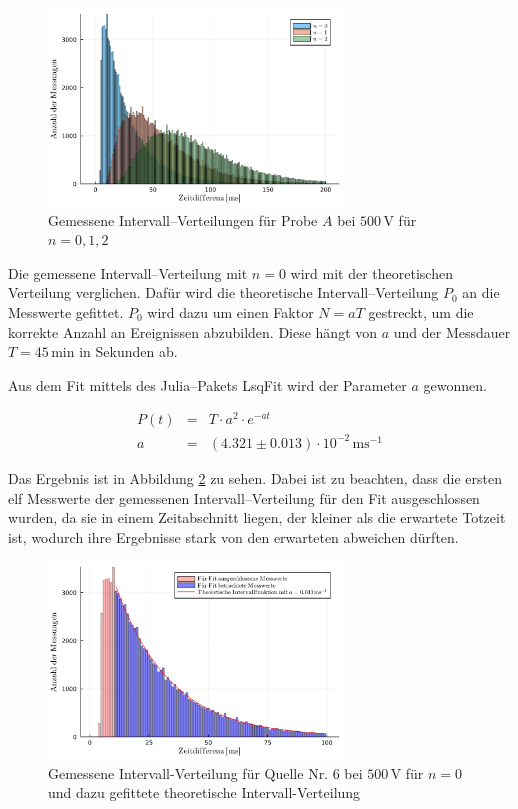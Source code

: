 \documentclass[12pt,a4paper]{scrartcl}
\numberwithin{equation}{section} %
\newcommand{\code}[1]{\textsf{#1}}
\begin{document}
\begin{figure}[h]
	\centering
	\includegraphics[width=0.7\textwidth]{../media/B3.1/interval.pdf}
	\caption{Gemessene Intervall--Verteilungen für Probe $A$ bei $500 \mathrm{\, V}$ für $n = 0,1,2$}
	\label{fig:interval}
\end{figure}

\noindent
Die gemessene Intervall--Verteilung mit $n = 0$ wird mit der theoretischen Verteilung verglichen. Dafür wird die theoretische Intervall--Verteilung $P_0$ an die Messwerte gefittet. $P_0$ wird dazu um einen Faktor $N=aT$ gestreckt, um die korrekte Anzahl an Ereignissen abzubilden. Diese hängt von $a$ und der Messdauer $T=45\mathrm{\,min}$ in Sekunden ab.

Aus dem Fit mittels des \code{Julia}--Pakets \code{LsqFit} \cite{Julia:LsqFit} wird der Parameter $a$ gewonnen.

\begin{eqnarray}
	P(t) &=& T \cdot a^2 \cdot e^{-at} \\
	a &=& (4.321 \pm 0.013) \cdot 10^{-2} \mathrm{\,ms^{-1}}
\end{eqnarray}

\noindent
Das Ergebnis ist in Abbildung \ref{fig:intervalFit} zu sehen. Dabei ist zu beachten, dass die ersten elf Messwerte der gemessenen Intervall--Verteilung für den Fit ausgeschlossen wurden, da sie in einem Zeitabschnitt liegen, der kleiner als die erwartete Totzeit ist, wodurch ihre Ergebnisse stark von den erwarteten abweichen dürften.

\begin{figure}
	\centering
	\includegraphics[width=0.7\textwidth]{../media/B3.1/intervalFit.pdf}
	\caption{Gemessene Intervall-Verteilung für Quelle Nr. 6 bei $500 \mathrm{\, V}$ für $n = 0$ und dazu gefittete theoretische Intervall-Verteilung}
	\label{fig:intervalFit}
\end{figure}
\end{document}
